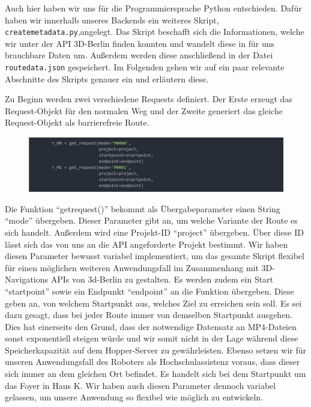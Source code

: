 Auch hier haben wir uns für die Programmiersprache Python entschieden. Dafür haben wir innerhalb unseres Backends ein weiteres Skript, \verb|createmetadata.py|,angelegt. Das Skript beschafft sich die Informationen, welche wir unter der API 3D-Berlin finden konnten und wandelt diese in für uns brauchbare Daten um. Außerdem werden diese anschließend in der Datei \verb|routedata.json| gespeichert. Im Folgenden gehen wir auf ein paar relevante Abschnitte des Skripts genauer ein und erläutern diese.

Zu Beginn werden zwei verschiedene Requests definiert. Der Erste erzeugt das Request-Objekt für den normalen Weg und der Zweite generiert das gleiche Request-Objekt als barrierefreie Route.

\begin{figure}[H]
    \includegraphics[width=\textwidth]{Figures/3DNavigator/code05.jpg}
    \centering
\end{figure} \vspace{-3.5mm}

Die Funktion “getrequest()” bekommt als Übergabeparameter einen String “mode” übergeben. Dieser Parameter gibt an, um welche Variante der Route es sich handelt. Außerdem wird eine Projekt-ID “project” übergeben. Über diese ID lässt sich das von uns an die API angeforderte Projekt bestimmt. Wir haben diesen Parameter bewusst variabel implementiert, um das gesamte Skript flexibel für einen möglichen weiteren Anwendungsfall im Zusammenhang mit 3D-Navigations APIs von 3d-Berlin zu gestalten. Es werden zudem ein Start “startpoint” sowie ein Endpunkt ``endpoint'' an die Funktion übergeben. Diese geben an, von welchem Startpunkt aus, welches Ziel zu erreichen sein soll. Es sei dazu gesagt, dass bei jeder Route immer von demselben Startpunkt ausgehen. Dies hat einerseits den Grund, dass der notwendige Datensatz an MP4-Dateien sonst exponentiell steigen würde und wir somit nicht in der Lage während diese Speicherkapazität auf dem Hopper-Server zu gewährleisten. Ebenso setzen wir für unseren Anwendungsfall des Roboters als Hochschulassistenz voraus, dass dieser sich immer an dem gleichen Ort befindet. Es handelt sich bei dem Startpunkt um das Foyer in Haus K. Wir haben auch diesen Parameter dennoch variabel gelassen, um unsere Anwendung so flexibel wie möglich zu entwickeln.\\

